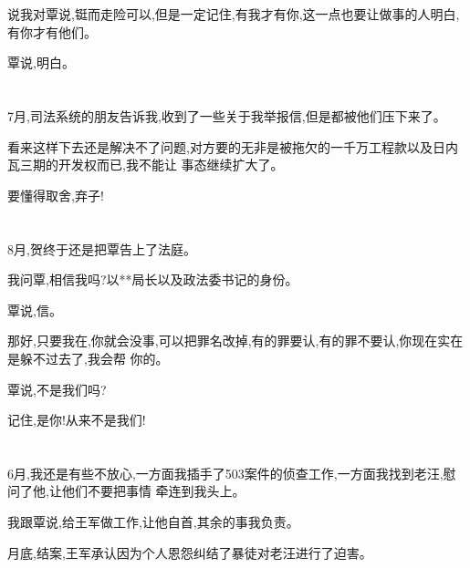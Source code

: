 \documentclass[11pt]{article}
\begin{document}
说我对覃说,铤而走险可以,但是一定记住,有我才有你,这一点也要让做事的人明白,有你才有他们。

覃说,明白。

\section{}
7月,司法系统的朋友告诉我,收到了一些关于我举报信,但是都被他们压下来了。

看来这样下去还是解决不了问题,对方要的无非是被拖欠的一千万工程款以及日内瓦三期的开发权而已,我不能让
事态继续扩大了。

要懂得取舍,弃子!

\section{}
8月,贺终于还是把覃告上了法庭。

我问覃,相信我吗?以**局长以及政法委书记的身份。

覃说,信。

那好,只要我在,你就会没事,可以把罪名改掉,有的罪要认,有的罪不要认,你现在实在是躲不过去了,我会帮
你的。

覃说,不是我们吗?

记住,是你!从来不是我们!

\section{}
6月,我还是有些不放心,一方面我插手了503案件的侦查工作,一方面我找到老汪,慰问了他,让他们不要把事情
牵连到我头上。

我跟覃说,给王军做工作,让他自首,其余的事我负责。

月底,结案,王军承认因为个人恩怨纠结了暴徒对老汪进行了迫害。
\end{document}
